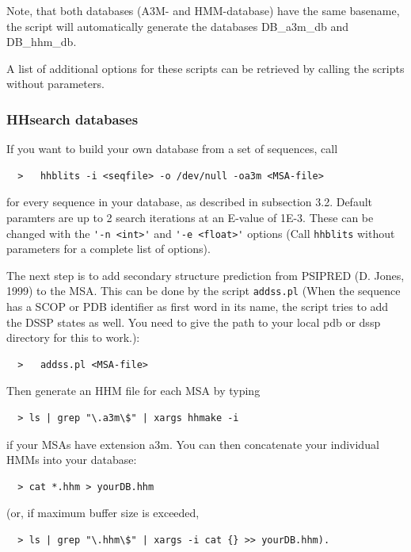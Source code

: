 \documentclass[11pt,a4paper]{article}
\begin{document}
Note, that both databases (A3M- and HMM-database) have the same basename, the script will
automatically generate the databases DB\_a3m\_db and DB\_hhm\_db.

A list of additional options for these scripts can be retrieved by calling the scripts without 
parameters.

\subsubsection*{HHsearch databases}

If you want to build your own database from a set of sequences, call 
\begin{verbatim}
  >   hhblits -i <seqfile> -o /dev/null -oa3m <MSA-file>
\end{verbatim}

for every sequence in your database, as described in subsection 3.2. Default paramters 
are up to 2 search iterations at an E-value of 1E-3. These can be changed with the 
\verb`'-n <int>'` and \verb`'-e <float>'` options (Call \verb`hhblits` without parameters for a 
complete list of options). 

The next step is to add secondary structure prediction from PSIPRED (D. Jones, 1999) to the
MSA. This can be done by the script \verb`addss.pl` (When the sequence has a SCOP or PDB identifier as first word 
in its name, the script tries to add the DSSP states as well. You need to give the 
path to your local pdb or dssp directory for this to work.):

\begin{verbatim}
  >   addss.pl <MSA-file>
\end{verbatim}

Then generate an HHM file for each MSA by typing
\begin{verbatim}
  > ls | grep "\.a3m\$" | xargs hhmake -i 
\end{verbatim}

if your MSAs have extension a3m. You can then concatenate your individual HMMs
into your database:
\begin{verbatim}
  > cat *.hhm > yourDB.hhm
\end{verbatim}
(or, if maximum buffer size is exceeded, 
\begin{verbatim}
  > ls | grep "\.hhm\$" | xargs -i cat {} >> yourDB.hhm).
\end{verbatim}
\end{document}
